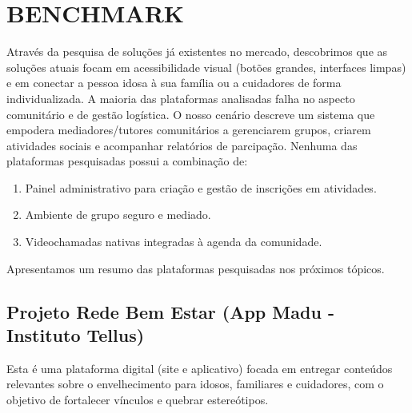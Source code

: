 \newpage
\section{BENCHMARK}
Através da pesquisa de soluções já existentes no mercado, descobrimos que as soluções atuais focam em acessibilidade visual (botões grandes, interfaces limpas) e em conectar a pessoa idosa à sua família ou a cuidadores de forma individualizada. A maioria das plataformas analisadas falha no aspecto comunitário e de gestão logística. O nosso cenário descreve um sistema que empodera mediadores/tutores comunitários a gerenciarem grupos, criarem atividades sociais e acompanhar relatórios de parcipação. Nenhuma das plataformas pesquisadas possui a combinação de:

\begin{enumerate}
    \item Painel administrativo para criação e gestão de inscrições em atividades.
    \item Ambiente de grupo seguro e mediado.
    \item Videochamadas nativas integradas à agenda da comunidade.
\end{enumerate}

Apresentamos um resumo das plataformas pesquisadas nos próximos tópicos.

\subsection{Projeto Rede Bem Estar (App Madu - Instituto Tellus)}
Esta é uma plataforma digital (site e aplicativo) focada em entregar conteúdos relevantes sobre o envelhecimento para idosos, familiares e cuidadores, com o objetivo de fortalecer vínculos e quebrar estereótipos.

